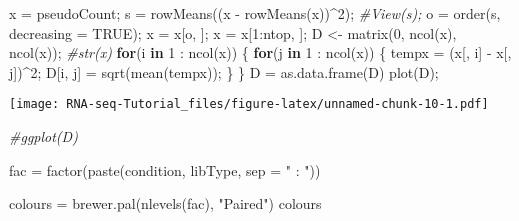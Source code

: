 \documentclass[
]{article}
\newenvironment{Shaded}{\begin{snugshade}}{\end{snugshade}}
\newcommand{\AttributeTok}[1]{\textcolor[rgb]{0.77,0.63,0.00}{#1}}
\newcommand{\CommentTok}[1]{\textcolor[rgb]{0.56,0.35,0.01}{\textit{#1}}}
\newcommand{\ConstantTok}[1]{\textcolor[rgb]{0.00,0.00,0.00}{#1}}
\newcommand{\ControlFlowTok}[1]{\textcolor[rgb]{0.13,0.29,0.53}{\textbf{#1}}}
\newcommand{\DecValTok}[1]{\textcolor[rgb]{0.00,0.00,0.81}{#1}}
\newcommand{\FunctionTok}[1]{\textcolor[rgb]{0.00,0.00,0.00}{#1}}
\newcommand{\NormalTok}[1]{#1}
\newcommand{\OtherTok}[1]{\textcolor[rgb]{0.56,0.35,0.01}{#1}}
\newcommand{\SpecialCharTok}[1]{\textcolor[rgb]{0.00,0.00,0.00}{#1}}
\newcommand{\StringTok}[1]{\textcolor[rgb]{0.31,0.60,0.02}{#1}}
\begin{document}
\begin{Shaded}
\begin{Highlighting}[]
\NormalTok{x }\OtherTok{=}\NormalTok{ pseudoCount;}
\NormalTok{s }\OtherTok{=} \FunctionTok{rowMeans}\NormalTok{((x }\SpecialCharTok{{-}} \FunctionTok{rowMeans}\NormalTok{(x))}\SpecialCharTok{\^{}}\DecValTok{2}\NormalTok{);}
\CommentTok{\#View(s);}
\NormalTok{o }\OtherTok{=} \FunctionTok{order}\NormalTok{(s, }\AttributeTok{decreasing =} \ConstantTok{TRUE}\NormalTok{);}
\NormalTok{x }\OtherTok{=}\NormalTok{ x[o, ];}
\NormalTok{x }\OtherTok{=}\NormalTok{ x[}\DecValTok{1}\SpecialCharTok{:}\NormalTok{ntop, ];}
\NormalTok{D }\OtherTok{\textless{}{-}} \FunctionTok{matrix}\NormalTok{(}\DecValTok{0}\NormalTok{, }\FunctionTok{ncol}\NormalTok{(x), }\FunctionTok{ncol}\NormalTok{(x));}
\CommentTok{\#str(x)}
\ControlFlowTok{for}\NormalTok{(i }\ControlFlowTok{in} \DecValTok{1} \SpecialCharTok{:} \FunctionTok{ncol}\NormalTok{(x))}
\NormalTok{\{}
  \ControlFlowTok{for}\NormalTok{(j }\ControlFlowTok{in} \DecValTok{1} \SpecialCharTok{:} \FunctionTok{ncol}\NormalTok{(x))}
\NormalTok{  \{}
\NormalTok{    tempx }\OtherTok{=}\NormalTok{ (x[, i] }\SpecialCharTok{{-}}\NormalTok{ x[, j])}\SpecialCharTok{\^{}}\DecValTok{2}\NormalTok{;}
\NormalTok{    D[i, j] }\OtherTok{=} \FunctionTok{sqrt}\NormalTok{(}\FunctionTok{mean}\NormalTok{(tempx));}
\NormalTok{  \}}
\NormalTok{\}}
\NormalTok{D }\OtherTok{=} \FunctionTok{as.data.frame}\NormalTok{(D)}
\FunctionTok{plot}\NormalTok{(D);}
\end{Highlighting}
\end{Shaded}

\texttt{[image: RNA-seq-Tutorial\_files/figure-latex/unnamed-chunk-10-1.pdf]}

\begin{Shaded}
\begin{Highlighting}[]
\CommentTok{\#ggplot(D)}
\end{Highlighting}
\end{Shaded}

\begin{Shaded}
\begin{Highlighting}[]
\NormalTok{fac }\OtherTok{=} \FunctionTok{factor}\NormalTok{(}\FunctionTok{paste}\NormalTok{(condition, libType, }\AttributeTok{sep =} \StringTok{" : "}\NormalTok{))}

\NormalTok{colours }\OtherTok{=} \FunctionTok{brewer.pal}\NormalTok{(}\FunctionTok{nlevels}\NormalTok{(fac), }\StringTok{"Paired"}\NormalTok{)}
\NormalTok{colours}
\end{Highlighting}
\end{Shaded}
\end{document}
